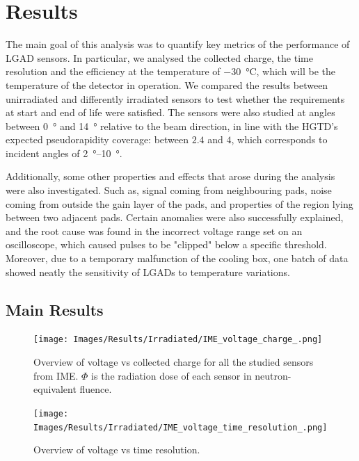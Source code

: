 \chapter{Results}\label{chap:results}

The main goal of this analysis was to quantify key metrics of the performance of LGAD sensors. In particular, we analysed the collected charge, the time resolution and the efficiency at the temperature of \qty{-30}{\degreeCelsius}, which will be the temperature of the detector in operation. We compared the results between unirradiated and differently irradiated sensors to test whether the requirements at start and end of life were satisfied. The sensors were also studied at angles between \qty{0}{\degree} and \qty{14}{\degree} relative to the beam direction, in line with the HGTD's expected pseudorapidity coverage: between \(2.4\) and \(4\), which corresponds to incident angles of \qtyrange{2}{10}{\degree}.

Additionally, some other properties and effects that arose during the analysis were also investigated. Such as, signal coming from neighbouring pads, noise coming from outside the gain layer of the pads, and properties of the region lying between two adjacent pads. Certain anomalies were also successfully explained, and the root cause was found in the incorrect voltage range set on an oscilloscope, which caused pulses to be "clipped" below a specific threshold. Moreover, due to a temporary malfunction of the cooling box, one batch of data showed neatly the sensitivity of LGADs to temperature variations.

\section{Main Results}

\begin{figure}[h!tbp]
    \centering
    \texttt{[image: Images/Results/Irradiated/IME\_voltage\_charge\_.png]}
    \captionsetup{width=\captionwidth}
    \caption{Overview of voltage vs collected charge for all the studied sensors from IME. \(\Phi\) is the radiation dose of each sensor in neutron-equivalent fluence.}
    \label{fig:irradiated_IME_voltage_charge}
\end{figure}


\begin{figure}[h!tbp]
    \centering
    \texttt{[image: Images/Results/Irradiated/IME\_voltage\_time\_resolution\_.png]}
    \captionsetup{width=\captionwidth}
    \caption{Overview of voltage vs time resolution.}
    \label{fig:irradiated_IME_voltage_time_res}
\end{figure}

